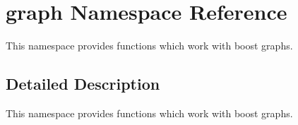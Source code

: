\hypertarget{namespacegraph}{}\section{graph Namespace Reference}
\label{namespacegraph}


This namespace provides functions which work with boost graphs.  




\subsection{Detailed Description}
This namespace provides functions which work with boost graphs. 